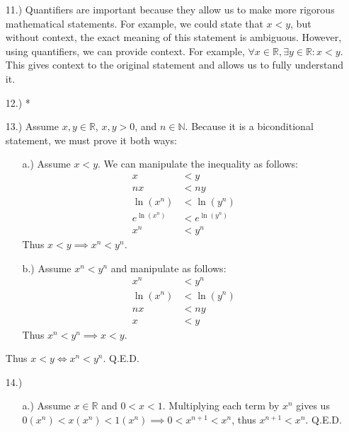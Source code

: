 \documentclass[12pt]{article}
\begin{document}
\pagestyle{fancy}

\normalsize
\begin{itemize}
    \item [11.)] Quantifiers are important because they allow us to make more rigorous mathematical statements. For example, we could state that $x<y$, but without context, the exact meaning of this statement is ambiguous. However, using quantifiers, we can provide context. For example, $\forall x\in\mathbb{R},\exists y\in\mathbb{R}:x<y$. This gives context to the original statement and allows us to fully understand it.

    \item [12.)] *

    \item [13.)] Assume $x,y\in\mathbb{R}$, $x,y>0$, and $n\in\mathbb{N}$. Because it is a biconditional statement, we must prove it both ways:
    \begin{itemize}
        \item [a.)] Assume $x<y$. We can manipulate the inequality as follows:
        \begin{align*}
            x&<y\\
            nx&<ny\\
            \ln(x^n)&<\ln(y^n)\\
            e^{\ln(x^n)}&<e^{\ln(y^n)}\\
            x^n&<y^n
        \end{align*}
        Thus $x<y\implies x^n<y^n$.

        \item [b.)] Assume $x^n<y^n$ and manipulate as follows:
        \begin{align*}
            x^n&<y^n\\
            \ln(x^n)&<\ln(y^n)\\
            nx&<ny\\
            x&<y
        \end{align*}
        Thus $x^n<y^n\implies x<y$.
    \end{itemize}
    Thus $x<y\iff x^n<y^n$. Q.E.D.

    \item [14.)] \begin{itemize}
        \item [a.)] Assume $x\in\mathbb{R}$ and $0<x<1$. Multiplying each term by $x^n$ gives us $0(x^n)<x(x^n)<1(x^n)\implies0<x^{n+1}<x^n$, thus $x^{n+1}<x^n$. Q.E.D.


\end{itemize}
\end{itemize}
\end{document}
